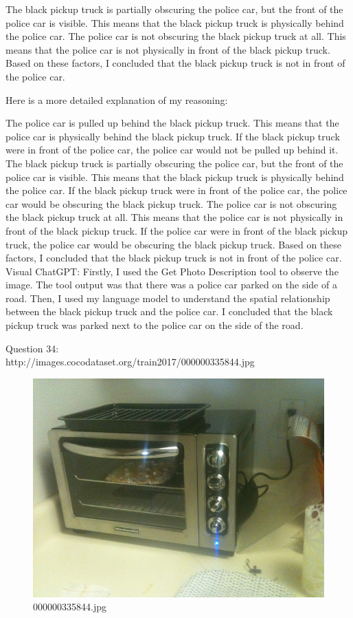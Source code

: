 \begin{enumerate}
        The black pickup truck is partially obscuring the police car, but the front of the police car is visible. This means that the black pickup truck is physically behind the police car.
        The police car is not obscuring the black pickup truck at all. This means that the police car is not physically in front of the black pickup truck.
        Based on these factors, I concluded that the black pickup truck is not in front of the police car.
        
        Here is a more detailed explanation of my reasoning:
        
        The police car is pulled up behind the black pickup truck. This means that the police car is physically behind the black pickup truck. If the black pickup truck were in front of the police car, the police car would not be pulled up behind it.
        The black pickup truck is partially obscuring the police car, but the front of the police car is visible. This means that the black pickup truck is physically behind the police car. If the black pickup truck were in front of the police car, the police car would be obscuring the black pickup truck.
        The police car is not obscuring the black pickup truck at all. This means that the police car is not physically in front of the black pickup truck. If the police car were in front of the black pickup truck, the police car would be obscuring the black pickup truck.
        Based on these factors, I concluded that the black pickup truck is not in front of the police car.
        \subitem Visual ChatGPT: Firstly, I used the Get Photo Description tool to observe the image. The tool output was that there was a police car parked on the side of a road. Then, I used my language model to understand the spatial relationship between the black pickup truck and the police car. I concluded that the black pickup truck was parked next to the police car on the side of the road.
    \end{enumerate}
    Question 34:\\http://images.cocodataset.org/train2017/000000335844.jpg
    \begin{figure}[h]
        \centering
        \includegraphics[width=0.8\linewidth]{../image set/easy/000000335844.jpg}
        \caption{000000335844.jpg}
    \end{figure}
